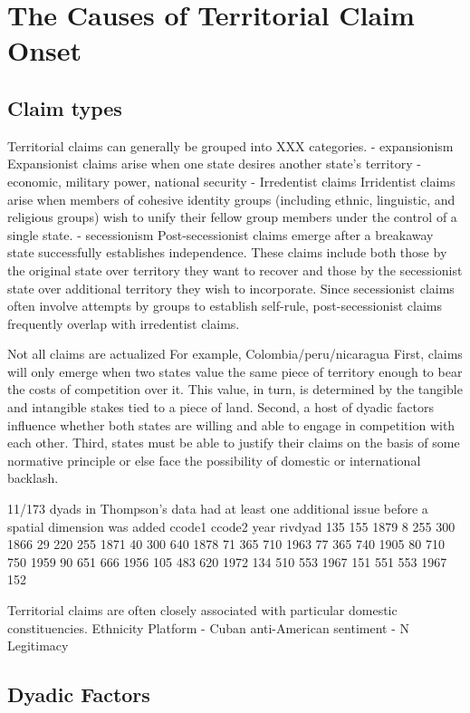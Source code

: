 \section{The Causes of Territorial Claim Onset}
\subsection{Claim types}

Territorial claims can generally be grouped into XXX categories.
- expansionism
Expansionist claims arise when one state desires another state's territory  - economic, military power, national security
- Irredentist claims 
Irridentist claims arise when members of cohesive identity groups (including ethnic, linguistic, and religious groups) wish to unify their fellow group members under the control of a single state.
- secessionism
Post-secessionist claims emerge after a breakaway state successfully establishes independence. These claims include both those by the original state over territory they want to recover and those by the secessionist state over additional territory they wish to incorporate. Since secessionist claims often involve attempts by groups to establish self-rule, post-secessionist claims frequently overlap with irredentist claims. 

Not all claims are actualized
For example, Colombia/peru/nicaragua
First, claims will only emerge when two states value the same piece of territory enough to bear the costs of competition over it. This value, in turn, is determined by the tangible and intangible stakes tied to a piece of land. Second, a host of dyadic factors influence whether both states are willing and able to engage in competition with each other. Third, states must be able to justify their claims on the basis of some normative principle or else face the possibility of domestic or international backlash.


11/173 dyads in Thompson's data had at least one additional issue before a spatial dimension was added
ccode1	ccode2	year	rivdyad
135	155	1879	8
255	300	1866	29
220	255	1871	40
300	640	1878	71
365	710	1963	77
365	740	1905	80
710	750	1959	90
651	666	1956	105
483	620	1972	134
510	553	1967	151
551	553	1967	152



Territorial claims are often closely associated with particular domestic constituencies. 
Ethnicity
Platform
 - Cuban anti-American sentiment
 - N
Legitimacy


\subsection{Dyadic Factors}

